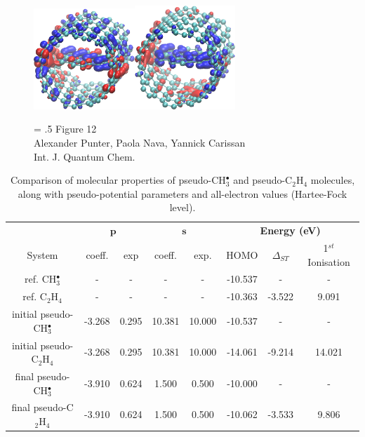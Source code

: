 \documentclass[12pt]{article}
\begin{document}
\begin{figure}
\begin{center}
\includegraphics[width=3.8cm]{trans_55_crop.eps}\hspace*{4mm}\includegraphics[width=3.8cm]{trans_59_crop.eps}
\end{center}
{\Large
\begin{minipage}[t]{3in}
\baselineskip = .5\baselineskip
Figure 12 \\
Alexander Punter, Paola Nava, Yannick Carissan\\
Int. J. Quantum Chem.
\end{minipage}
}
\end{figure}

\clearpage

\begin{table}[h]
\caption{\label{table:potential_params} Comparison of molecular properties of pseudo-CH$^{\bullet}_{3}$ and pseudo-C$_{2}$H$_{4}$ molecules, along with pseudo-potential parameters and all-electron values (Hartee-Fock level).}
\begin{tabular}{| c | c | c | c | c | c | c | c| }
\hline
 & \multicolumn{2}{c}{\textbf{$\bm{p}$}} & \multicolumn{2}{c|}{$\bm{s}$} & \multicolumn{3}{c|}{\textbf{Energy (eV)}} \\
System & coeff. & exp & coeff. & exp. & HOMO & $\Delta_{ST}$ & 1$^{st}$ Ionisation \\
\hline
ref. CH$^{\bullet}_{3}$ & - & - & - & - & -10.537 & - & - \\
ref. C$_{2}$H$_{4}$ & - & - & - & - & -10.363 & -3.522 & 9.091 \\
\hline
initial pseudo-CH$^{\bullet}_{3}$ & -3.268 & 0.295 & 10.381 & 10.000 & -10.537 & - & - \\
initial pseudo-C$_{2}$H$_{4}$ & -3.268 & 0.295 & 10.381 & 10.000 & -14.061 & -9.214 & 14.021\\
\hline
final pseudo-CH$^{\bullet}_{3}$ & -3.910 & 0.624 & 1.500 & 0.500 & -10.000 & - & - \\
final pseudo-C$_{2}$H$_{4}$ & -3.910 & 0.624 & 1.500 & 0.500 & -10.062 & -3.533 & 9.806 \\
\hline
\end{tabular}
\end{table}
\end{document}
